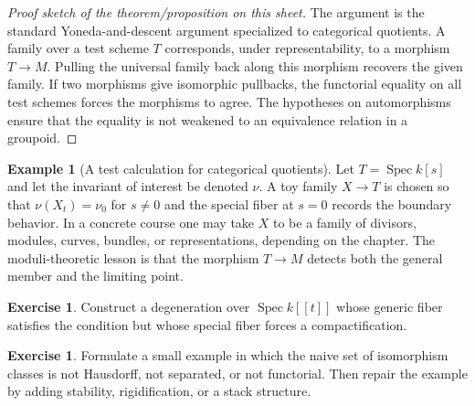 \documentclass[11pt]{amsart}
\theoremstyle{definition}
\newtheorem{example}[theorem]{Example}
\newtheorem{exercise}[theorem]{Exercise}
\newcommand{\Spec}{\operatorname{Spec}}
\begin{document}
\begin{proof}[Proof sketch of the theorem/proposition on this sheet]
The argument is the standard Yoneda-and-descent argument specialized to categorical quotients.  A family over a test scheme $T$ corresponds, under representability, to a morphism $T\to M$.  Pulling the universal family back along this morphism recovers the given family.  If two morphisms give isomorphic pullbacks, the functorial equality on all test schemes forces the morphisms to agree.  The hypotheses on automorphisms ensure that the equality is not weakened to an equivalence relation in a groupoid.
\end{proof}
\begin{example}[A test calculation for categorical quotients]
Let $T=\Spec k[s]$ and let the invariant of interest be denoted $\nu$.  A toy family $X\to T$ is chosen so that $\nu(X_t)=\nu_0$ for $s\ne0$ and the special fiber at $s=0$ records the boundary behavior.  In a concrete course one may take $X$ to be a family of divisors, modules, curves, bundles, or representations, depending on the chapter.  The moduli-theoretic lesson is that the morphism $T\to M$ detects both the general member and the limiting point.
\end{example}
\begin{exercise}
Construct a degeneration over $\Spec k[[t]]$ whose generic fiber satisfies the condition but whose special fiber forces a compactification.
\end{exercise}
\begin{exercise}
Formulate a small example in which the naive set of isomorphism classes is not Hausdorff, not separated, or not functorial.  Then repair the example by adding stability, rigidification, or a stack structure.
\end{exercise}
\clearpage
\end{document}
